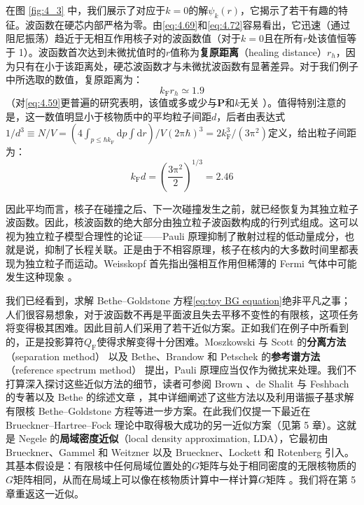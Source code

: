 在图 \ref{fig:4_3} 中，我们展示了对应于$k=0$的解$\psi_{k}(r)$，它揭示了若干有趣的特征。波函数在硬芯内部严格为零。由\ref{eq:4.69}和\ref{eq:4.72}容易看出，它迅速（通过阻尼振荡）趋近于无相互作用核子对的波函数值（对于$k=0$且在所有$r$处该值恒等于
1）。波函数首次达到未微扰值时的$r$值称为\textbf{复原距离}（healing distance）$r_{h}$，因为只有在小于该距离处，硬芯波函数才与未微扰波函数有显著差异。对于我们例子中所选取的数值，复原距离为：
\begin{equation}
k_{\text{F}}r_{h}\simeq1.9\label{eq:4.73}
\end{equation}
（对\ref{eq:4.59}更普遍的研究表明，该值或多或少与$\boldsymbol{P}$和$k$无关 \cite{WG67a}）。值得特别注意的是，这一数值明显小于核物质中的平均粒子间距$d$，后者由表达式$1/d^{3}\equiv N/V=(4\int_{p\le\hbar k_{\text{F}}}\mathrm{d}p\int\mathrm{d}r)/V(2\mathrm{\pi}\hbar)^{3}=2k^{3}_{\text{F}}/(3\mathrm{\pi}^{2})$定义，给出粒子间距为：
\begin{equation}
k_{\text{F}}d=\left(\frac{3\mathrm{\pi}^{2}}{2}\right)^{1/3}=2.46\label{eq:4.74}
\end{equation}

因此平均而言，核子在碰撞之后、下一次碰撞发生之前，就已经恢复为其独立粒子波函数。因此，核波函数的绝大部分由独立粒子波函数构成的行列式组成。这可以视为独立粒子模型合理性的论证——Pauli
原理抑制了散射过程的低动量成分，也就是说，抑制了长程关联。正是由于不相容原理，核子在核内的大多数时间里都表现为独立粒子而运动。Weisskopf
首先指出强相互作用但稀薄的 Fermi 气体中可能发生这种现象 \cite{We50}。

我们已经看到，求解 Bethe–Goldstone 方程\ref{eq:toy BG equation}绝非平凡之事；人们很容易想象，对于波函数不再是平面波且失去平移不变性的有限核，这项任务将变得极其困难。因此目前人们采用了若干近似方案。正如我们在例子中所看到的，正是投影算符$Q_{\text{F}}$使得求解变得十分困难。Moszkowski
与 Scott 的\textbf{分离方法}（separation method）\cite{MS60} 以及 Bethe、Brandow
和 Petschek 的\textbf{参考谱方法}（reference spectrum method）\cite{BBP63}
提出，Pauli 原理应当仅作为微扰来处理。我们不打算深入探讨这些近似方法的细节，读者可参阅 Brown \cite{Br64}、de
Shalit 与 Feshbach \cite{SF74} 的专著以及 Bethe 的综述文章 \cite{Be71}，其中详细阐述了这些方法以及利用谐振子基求解有限核
Bethe–Goldstone 方程等进一步方案。在此我们仅提一下最近在 Brueckner–Hartree–Fock 理论中取得极大成功的另一近似方案（见第
5 章）。这就是 Negele 的\textbf{局域密度近似}（local density approximation, LDA）\cite{Ne70,Ne75}，它最初由
Brueckner、Gammel 和 Weitzner \cite{BGW58} 以及 Brueckner、Lockett 和 Rotenberg
\cite{BLR61} 引入。其基本假设是：有限核中任何局域位置处的$G$矩阵与处于相同密度的无限核物质的$G$矩阵相同，从而在局域上可以像在核物质计算中一样计算$G$矩阵
\cite{Be71,Ne75}。我们将在第 5 章重返这一近似。

